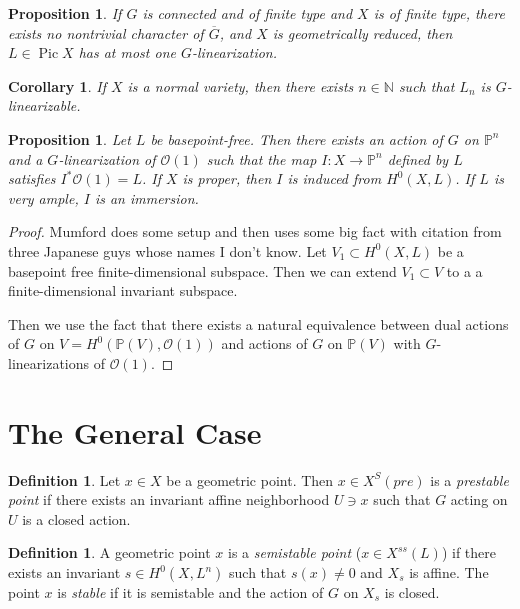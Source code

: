 \documentclass[leqno, openany]{memoir}
\newtheorem{cor}[thm]{Corollary}
\newtheorem{prop}[thm]{Proposition}
\theoremstyle{definition}
\newtheorem{defn}[thm]{Definition}
\theoremstyle{remark}
\theoremstyle{plain}
\theoremstyle{definition}
\theoremstyle{remark}
\newcommand{\N}{\mathbb{N}}
\renewcommand{\P}{\mathbb{P}}
\newcommand{\mc}[1]{\mathcal{#1}}
\newcommand{\ol}[1]{\overline{#1}}
\DeclareMathOperator{\Pic}{Pic}
\begin{document}
\begin{prop}
    If $G$ is connected and of finite type and $X$ is of finite type, there exists no nontrivial character of $\ol{G}$, and $X$ is geometrically reduced, then $L \in \Pic X$ has at most one $G$-linearization.
\end{prop}

\begin{cor}
    If $X$ is a normal variety, then there exists $n \in \N$ such that $L_n$ is $G$-linearizable.
\end{cor}

\begin{prop}
    Let $L$ be basepoint-free. Then there exists an action of $G$ on $\P^n$ and a $G$-linearization of $\mc{O}(1)$ such that the map $I \colon X \to \P^n$ defined by $L$ satisfies $I^* \mc{O}(1) = L$. If $X$ is proper, then $I$ is induced from $H^0(X,L)$. If $L$ is very ample, $I$ is an immersion.
\end{prop}

\begin{proof}
    Mumford does some setup and then uses some big fact with citation from three Japanese guys whose names I don't know. Let $V_1 \subset H^0(X,L)$ be a basepoint free finite-dimensional subspace. Then we can extend $V_1 \subset V$ to a a finite-dimensional invariant subspace.

    Then we use the fact that there exists a natural equivalence between dual actions of $G$ on $V = H^0(\P(V), \mc{O}(1))$ and actions of $G$ on $\P(V)$ with $G$-linearizations of $\mc{O}(1)$.
\end{proof}

\section{The General Case}%
\label{sec:the_general_case}

\begin{defn}
    Let $x \in X$ be a geometric point. Then $x \in X^S(pre)$ is a \textit{prestable point}  if there exists an invariant affine neighborhood $U \ni x$ such that $G$ acting on $U$ is a closed action.
\end{defn}

\begin{defn}
    A geometric point $x$ is a \textit{semistable point} ($x \in X^{ss}(L)$) if there exists an invariant $s \in H^0(X,L^n)$ such that $s(x) \neq 0$ and $X_s$ is affine. The point $x$ is \textit{stable} if it is semistable and the action of $G$ on $X_s$ is closed. 
\end{defn}
\end{document}
